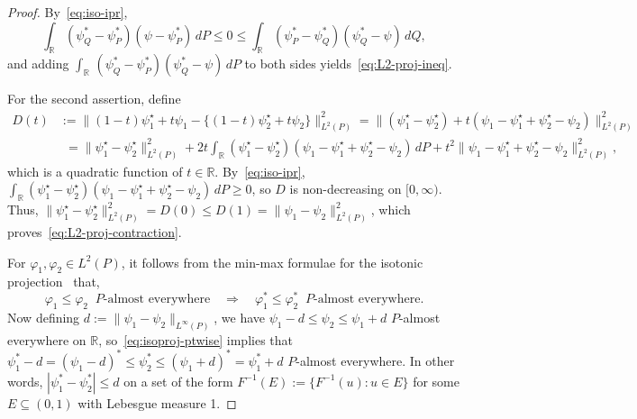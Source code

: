 \documentclass[a4paper]{article}
\newcommand{\R}{\mathbb{R}}
\newcommand{\norm}[1]{\|{#1}\|}
\theoremstyle{definition}
\begin{document}
\begin{proof}
By~\eqref{eq:iso-ipr},
\[
\int_\R (\psi_Q^* - \psi_P^*)(\psi - \psi_P^*)\,dP \leq 0 \leq \int_\R (\psi_P^* - \psi_Q^*)(\psi_Q^* - \psi)\,dQ,
\]
and adding $\int_\R \,(\psi_Q^* - \psi_P^*)(\psi_Q^* - \psi)\,dP$ to both sides yields~\eqref{eq:L2-proj-ineq}. 

For the second assertion, define
\begin{align*}
D(t) &:= \bigl\|(1 - t)\psi_1^\star + t\psi_1 - \{(1 - t)\psi_2^\star + t\psi_2\}\bigr\|_{L^2(P)}^2 = \bigl\|(\psi_1^\star - \psi_2^\star) + t(\psi_1 - \psi_1^\star + \psi_2^\star - \psi_2)\bigr\|_{L^2(P)}^2 \\
&\phantom{:}= \norm{\psi_1^\star - \psi_2^\star}_{L^2(P)}^2 + 2t\int_\R (\psi_1^\star - \psi_2^\star)(\psi_1 - \psi_1^\star + \psi_2^\star - \psi_2)\,dP + t^2\norm{\psi_1 - \psi_1^\star + \psi_2^\star - \psi_2}_{L^2(P)}^2,
\end{align*}
which is a quadratic function of $t \in \R$. By~\eqref{eq:iso-ipr}, $\int_\R (\psi_1^\star - \psi_2^\star)(\psi_1 - \psi_1^\star + \psi_2^\star - \psi_2)\,dP \geq 0$, so $D$ is non-decreasing on $[0,\infty)$. Thus, $\norm{\psi_1^\star - \psi_2^\star}_{L^2(P)}^2 = D(0) \leq D(1) = \norm{\psi_1 - \psi_2}_{L^2(P)}^2$, which proves~\eqref{eq:L2-proj-contraction}. 

For $\varphi_1,\varphi_2 \in L^2(P)$, it follows from the min-max formulae for the isotonic projection~\citep[Exercise~9.25\emph{(b)} and Theorem~9.37]{samworth24modern} that,
\begin{equation}
\label{eq:isoproj-ptwise}
\varphi_1 \leq \varphi_2 \;\;P\text{-almost everywhere} \quad \Rightarrow \quad \varphi_1^* \leq \varphi_2^* \;\;P\text{-almost everywhere}.
\end{equation}
Now defining $d := \norm{\psi_1 - \psi_2}_{L^\infty(P)}$, we have $\psi_1 - d \leq \psi_2 \leq \psi_1 + d$ $P$-almost everywhere on $\R$, so~\eqref{eq:isoproj-ptwise} implies that $\psi_1^* - d = (\psi_1 - d)^* \leq \psi_2^* \leq (\psi_1 + d)^* = \psi_1^* + d$ $P$-almost everywhere. In other words, $|\psi_1^* - \psi_2^*| \leq d$ on a set of the form $F^{-1}(E) := \{F^{-1}(u) : u \in E\}$ for some $E \subseteq (0,1)$ with Lebesgue measure 1.


\end{proof}
\end{document}
